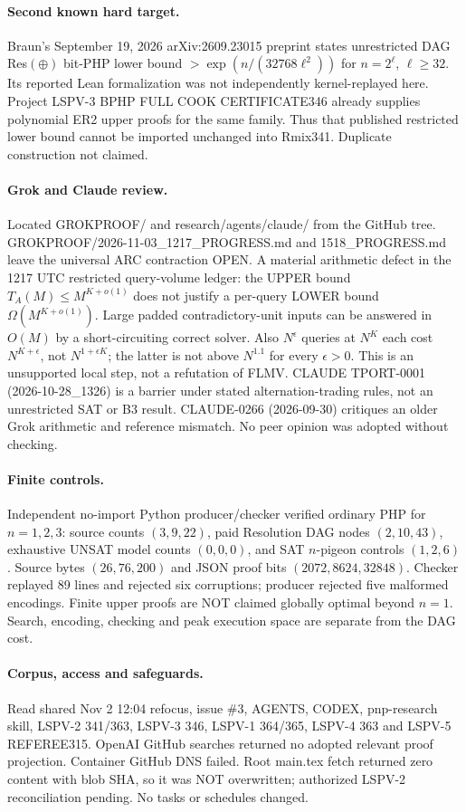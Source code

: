 \documentclass{article}
\begin{document}
\paragraph{Second known hard target.} Braun's September 19, 2026 arXiv:2609.23015 preprint states unrestricted DAG Res$(\oplus)$ bit-PHP lower bound $>\exp(n/(32768\ell^2))$ for $n=2^\ell$, $\ell\ge32$. Its reported Lean formalization was not independently kernel-replayed here. Project LSPV-3 BPHP FULL COOK CERTIFICATE346 already supplies polynomial ER2 upper proofs for the same family. Thus that published restricted lower bound cannot be imported unchanged into Rmix341. Duplicate construction not claimed.
\paragraph{Grok and Claude review.} Located GROKPROOF/ and research/agents/claude/ from the GitHub tree. GROKPROOF/2026-11-03_1217_PROGRESS.md and 1518_PROGRESS.md leave the universal ARC contraction OPEN. A material arithmetic defect in the 1217 UTC restricted query-volume ledger: the UPPER bound $T_A(M)\le M^{K+o(1)}$ does not justify a per-query LOWER bound $\Omega(M^{K+o(1)})$. Large padded contradictory-unit inputs can be answered in $O(M)$ by a short-circuiting correct solver. Also $N^\epsilon$ queries at $N^K$ each cost $N^{K+\epsilon}$, not $N^{1+\epsilon K}$; the latter is not above $N^{1.1}$ for every $\epsilon>0$. This is an unsupported local step, not a refutation of FLMV. CLAUDE TPORT-0001 (2026-10-28_1326) is a barrier under stated alternation-trading rules, not an unrestricted SAT or B3 result. CLAUDE-0266 (2026-09-30) critiques an older Grok arithmetic and reference mismatch. No peer opinion was adopted without checking.
\paragraph{Finite controls.} Independent no-import Python producer/checker verified ordinary PHP for $n=1,2,3$: source counts $(3,9,22)$, paid Resolution DAG nodes $(2,10,43)$, exhaustive UNSAT model counts $(0,0,0)$, and SAT $n$-pigeon controls $(1,2,6)$. Source bytes $(26,76,200)$ and JSON proof bits $(2072,8624,32848)$. Checker replayed 89 lines and rejected six corruptions; producer rejected five malformed encodings. Finite upper proofs are NOT claimed globally optimal beyond $n=1$. Search, encoding, checking and peak execution space are separate from the DAG cost.
\paragraph{Corpus, access and safeguards.} Read shared Nov 2 12:04 refocus, issue \#3, AGENTS, CODEX, pnp-research skill, LSPV-2 341/363, LSPV-3 346, LSPV-1 364/365, LSPV-4 363 and LSPV-5 REFEREE315. OpenAI GitHub searches returned no adopted relevant proof projection. Container GitHub DNS failed. Root main.tex fetch returned zero content with blob SHA, so it was NOT overwritten; authorized LSPV-2 reconciliation pending. No tasks or schedules changed.
\end{document}
